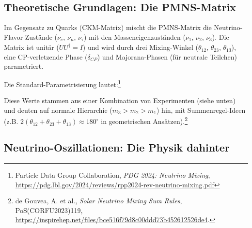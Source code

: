 	\subsection{Theoretische Grundlagen: Die PMNS-Matrix}
	
	Im Gegensatz zu Quarks (CKM-Matrix) mischt die PMNS-Matrix die Neutrino-Flavor-Zustände ($\nu_e$, $\nu_\mu$, $\nu_\tau$) mit den Masseneigenzuständen ($\nu_1$, $\nu_2$, $\nu_3$). Die Matrix ist unitär ($U U^\dagger = I$) und wird durch drei Mixing-Winkel ($\theta_{12}$, $\theta_{23}$, $\theta_{13}$), eine CP-verletzende Phase ($\delta_{CP}$) und Majorana-Phasen (für neutrale Teilchen) parametriert.
	
	Die Standard-Parametrisierung lautet:\footnote{Particle Data Group Collaboration, \emph{PDG 2024: Neutrino Mixing}, \url{https://pdg.lbl.gov/2024/reviews/rpp2024-rev-neutrino-mixing.pdf}}
	
	\begin{table}[h]
		\centering
		\caption{PDG 2024 Mixing-Parameter}
		\label{tab:pdgparams}
	\end{table}
	
	Diese Werte stammen aus einer Kombination von Experimenten (siehe unten) und deuten auf normale Hierarchie ($m_3 > m_2 > m_1$) hin, mit Summenregel-Ideen (z.B. $2(\theta_{12} + \theta_{23} + \theta_{13}) \approx 180^\circ$ in geometrischen Ansätzen).\footnote{de Gouvea, A. et al., \emph{Solar Neutrino Mixing Sum Rules}, PoS(CORFU2023)119, \url{https://inspirehep.net/files/bce516f79d8c00ddd73b452612526de4}.}
	
	\subsection{Neutrino-Oszillationen: Die Physik dahinter}
	
